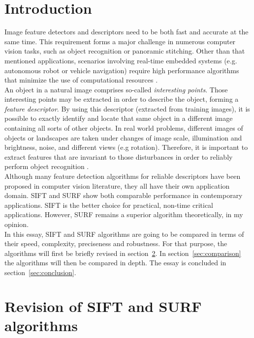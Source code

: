 \documentclass[a4paper, 11pt]{article} %
\begin{document}
\section{Introduction}
\label{sec:introduction}
Image feature detectors and descriptors need to be both fast and accurate at the same time. This requirement forms a major challenge in numerous computer vision tasks, such as object recognition or panoramic stitching. Other than that mentioned applications, scenarios involving real-time embedded systems (e.g. autonomous robot or vehicle navigation) require high performance algorithms that minimize the use of computational resources \cite{awad2016image}. \\
An object in a natural image comprises so-called \textit{interesting points}. Those interesting points may be extracted in order to describe the object, forming a \textit{feature descriptor}. By using this descriptor (extracted from training images), it is possible to exactly identify and locate that same object in a different image containing all sorts of other objects. In real world problems, different images of objects or landscapes are taken under changes of image scale, illumination and brightness, noise, and different views (e.g rotation). Therefore, it is important to extract features that are invariant to those disturbances in order to reliably perform object recognition \cite{juan2009comparison}.\\
Although many feature detection algorithms for reliable descriptors have been proposed in computer vision literature, they all have their own application domain. SIFT and SURF show both comparable performance in contemporary applications. SIFT is the better choice for practical, non-time critical applications. However, SURF remains a superior algorithm theoretically, in my opinion.\\
In this essay, SIFT and SURF algorithms are going to be compared in terms of their speed, complexity, preciseness and robustness. For that purpose, the algorithms will first be briefly revised in section~\ref{sec:revision}. In section~\ref{sec:comparison} the algorithms will then be compared in depth. The essay is concluded in section~\ref{sec:conclusion}.



\section{Revision of SIFT and SURF algorithms}
\label{sec:revision}
\end{document}
